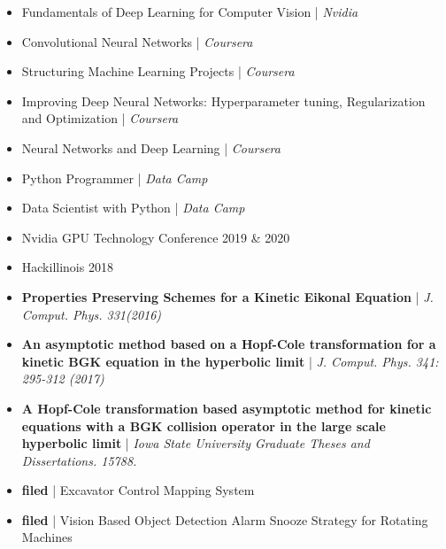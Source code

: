 \documentclass[10pt,a4paper]{altacv}
\begin{document}

\begin{itemize}
\item Fundamentals of Deep Learning for Computer Vision | \textit{Nvidia}
\item Convolutional Neural Networks | \textit{Coursera}
\item Structuring Machine Learning Projects | \textit{Coursera}
\item Improving Deep Neural Networks: Hyperparameter tuning, Regularization and Optimization | \textit{Coursera}
\item Neural Networks and Deep Learning | \textit{Coursera}
\item Python Programmer | \textit{Data Camp}
\item Data Scientist with Python | \textit{Data Camp}
\end{itemize}



\begin{itemize}
\item Nvidia GPU Technology Conference 2019 \& 2020
\item Hackillinois 2018

\end{itemize}


\begin{itemize}
\item \textbf{Properties Preserving Schemes for a Kinetic Eikonal Equation} | \textit{J. Comput. Phys. 331(2016)}
\item \textbf{An asymptotic method based on a Hopf-Cole transformation for a kinetic BGK equation in the hyperbolic limit} | \textit{J. Comput. Phys. 341: 295-312 (2017)}
\item \textbf{A Hopf-Cole transformation based asymptotic method for kinetic equations with a BGK collision operator in the large scale hyperbolic limit} | \textit{Iowa State University Graduate Theses and Dissertations. 15788.}

\end{itemize}


\begin{itemize}
\item \textbf{filed} | Excavator Control Mapping System
\item \textbf{filed} | Vision Based Object Detection Alarm Snooze Strategy for Rotating Machines

\end{itemize}
\end{document}
